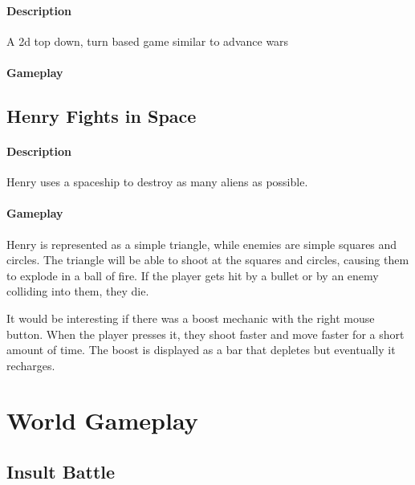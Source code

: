 \documentclass[12pt, a4paper, titlepage]{article}
\begin{document}
	\paragraph{Description} A 2d top down, turn based game similar to advance wars
	\paragraph{Gameplay}
	
    \subsection{Henry Fights in Space}
    
    	\paragraph{Description} Henry uses a spaceship to destroy as many aliens as possible.
	
	\paragraph{Gameplay} Henry is represented as a simple triangle, while enemies are simple squares and circles. The triangle will be able to shoot at the squares and circles,
	causing them to explode in a ball of fire. If the player gets hit by a bullet or by an enemy colliding into them, they die.
	
	It would be interesting if there was a boost mechanic with the right mouse button. When the player presses it, they shoot faster and move faster for a short amount of time. The boost
	is displayed as a bar that depletes but eventually it recharges.
    
    \section{World Gameplay}
    \subsection{Insult Battle}
    \subsection{}
    
\end{document}
